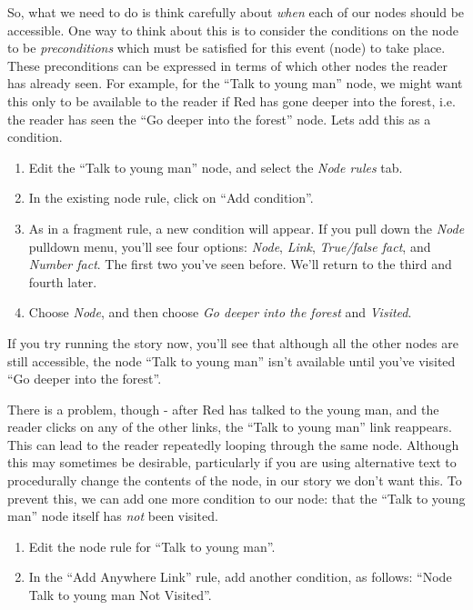 \documentclass{article}
\begin{document}
So, what we need to do is think carefully about \textit{when} each of our nodes should be accessible. One way to think about this is to consider the conditions on the node to be \textit{preconditions} which must be satisfied for this event (node) to take place. These preconditions can be expressed in terms of which other nodes the reader has already seen. For example, for the ``Talk to young man'' node, we might want this only to be available to the reader if Red has gone deeper into the forest, i.e. the reader has seen the ``Go deeper into the forest'' node. Lets add this as a condition.

\begin{enumerate}
  \item Edit the ``Talk to young man'' node, and select the \textit{Node rules} tab.
  \item In the existing node rule, click on ``Add condition''.
  \item As in a fragment rule, a new condition will appear. If you pull down the \textit{Node} pulldown menu, you'll see four options: \textit{Node}, \textit{Link}, \textit{True/false fact}, and \textit{Number fact}. The first two you've seen before. We'll return to the third and fourth later.
  \item Choose \textit{Node}, and then choose \textit{Go deeper into the
  forest} and \textit{Visited}.
\end{enumerate}

If you try running the story now, you'll see that although all the other nodes are still accessible, the node ``Talk to young man'' isn't available until you've visited ``Go deeper into the forest''.

There is a problem, though - after Red has talked to the young man, and the reader clicks on any of the other links, the ``Talk to young man'' link reappears. This can lead to the reader repeatedly looping through the same node. Although this may sometimes be desirable, particularly if you are using alternative text to procedurally change the contents of the node, in our story we don't want this. To prevent this, we can add one more condition to our node: that the ``Talk to young man'' node itself has \textit{not} been visited.

\begin{enumerate}
  \item Edit the node rule for ``Talk to young man''.
  \item In the ``Add Anywhere Link'' rule, add another condition, as follows: ``Node Talk to young man Not Visited''.
\end{enumerate}
\end{document}
